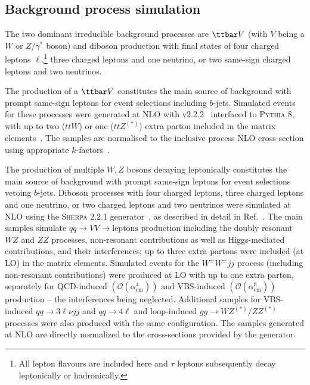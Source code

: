 \subsection*{Background process simulation}

The two dominant irreducible background processes are $\ttbar V$ (with $V$ being a $W$ or $Z/\gamma^*$ boson) 
and diboson production with final states of four charged leptons $\ell$,\footnote{All lepton flavours are included here and $\tau$
leptons subsequently decay leptonically or hadronically.} three charged leptons and one neutrino, or 
two same-sign charged leptons and two neutrinos. 

The production of a $\ttbar V$ 
constitutes the main source of background with prompt same-sign leptons for event selections including $b$-jets. 
Simulated events for these processes were generated at NLO with \AMCATNLO v2.2.2~\cite{Alwall:2014hca} interfaced to \textsc{Pythia} 8,
with up to two ($ttW$) or one ($ttZ^{(*)}$) extra parton included in the matrix elements~\cite{ATL-PHYS-PUB-2016-005}. 
The samples are normalised to the inclusive process NLO cross-section using appropriate $k$-factors~\cite{Alwall:2014hca}.

The production of multiple $W,Z$ bosons decaying leptonically 
constitutes the main source of background with prompt same-sign leptons for event selections vetoing $b$-jets. 
Diboson processes with four charged leptons, three charged leptons and one neutrino, or two charged leptons and two neutrinos 
were simulated at NLO using the \textsc{Sherpa} 2.2.1 generator~\cite{gleisberg:2008ta}, as described in detail in Ref.~\cite{ATL-PHYS-PUB-2016-002}. 
The main samples simulate $qq \to VV\to\text{leptons}$ production including the doubly resonant $WZ$ and $ZZ$ processes, 
non-resonant contributions as well as Higgs-mediated contributions, and their interferences; 
up to three extra partons were included (at LO) in the matrix elements. 
Simulated events for the $W^\pm W^\pm jj$ process (including non-resonant contributions) were produced at LO with up to one extra parton, 
separately for QCD-induced $\left(\mathcal{O}(\alpha_\text{em}^4)\right)$ 
and VBS-induced $\left(\mathcal{O}(\alpha_\text{em}^6)\right)$ production -- the interferences being neglected. 
Additional samples for VBS-induced $qq\to 3\ell\nu jj$ and $qq\to 4\ell$ and loop-induced $gg\to WZ^{(*)}/ZZ^{(*)}$ processes
were also produced with the same configuration.
The samples generated at NLO are directly normalized to the cross-sections provided by the generator. 

